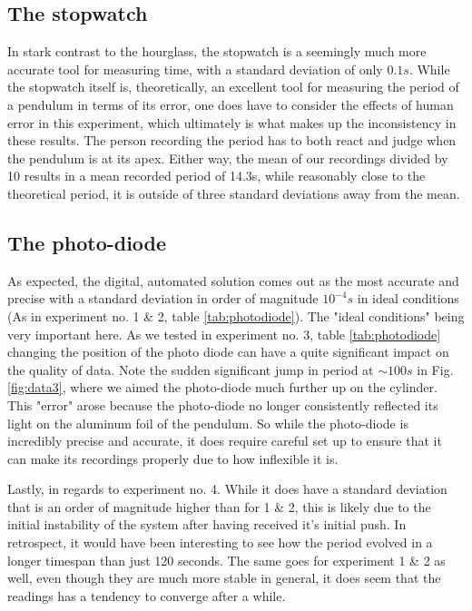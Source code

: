 \documentclass[%
 reprint,
 amsmath,amssymb,
 aps,
]{revtex4-1}
\begin{document}
	\subsection{The stopwatch}
		In stark contrast to the hourglass, the stopwatch is a seemingly much more accurate tool for measuring time, with a standard deviation of only $0.1s$. While the stopwatch itself is, theoretically, an excellent tool for measuring the period of a pendulum in terms of its error, one does have to consider the effects of human error in this experiment, which ultimately is what makes up the inconsistency in these results. The person recording the period has to both react and judge when the pendulum is at its apex. Either way, the mean of our recordings divided by 10 results in a mean recorded period of 14.3s, while reasonably close to the theoretical period, it is outside of three standard deviations away from the mean.

	\subsection{The photo-diode}
		As expected, the digital, automated solution comes out as the most accurate and precise with a standard deviation in order of magnitude $10^{-4}s$ in ideal conditions (As in experiment no. 1 \& 2, table \ref{tab:photodiode}). The "ideal conditions" being very important here. As we tested in experiment no. 3, table \ref{tab:photodiode} changing the position of the photo diode can have a quite significant impact on the quality of data. Note the sudden significant jump in period at $\sim 100s$ in Fig. \ref{fig:data3}, where we aimed the photo-diode much further up on the cylinder. This "error" arose because the photo-diode no longer consistently reflected its light on the aluminum foil of the pendulum. So while the photo-diode is incredibly precise and accurate, it does require careful set up to ensure that it can make its recordings properly due to how inflexible it is. 

		Lastly, in regards to experiment no. 4. While it does have a standard deviation that is an order of magnitude higher than for 1 \& 2, this is likely due to the initial instability of the system after having received it's initial push. In retrospect, it would have been interesting to see how the period evolved in a longer timespan than just 120 seconds. The same goes for experiment 1 \& 2 as well, even though they are much more stable in general, it does seem that the readings has a tendency to converge after a while. 
 
\end{document}

